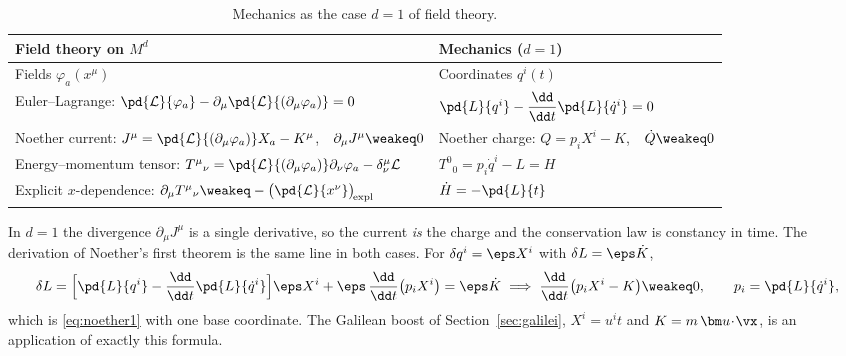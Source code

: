 \begin{table}[ht]
\centering
\small
\renewcommand{\arraystretch}{1.35}
\setlength{\tabcolsep}{4pt}
\begin{tabular}{@{}>{\raggedright\arraybackslash}p{7.3cm}>{\raggedright\arraybackslash}p{7.3cm}@{}}
\toprule
Field theory on $M^d$ & Mechanics ($d=1$)\\
\midrule
Fields $\varphi_a(x^\mu)$ & Coordinates $q^i(t)$\\
Euler--Lagrange: $\pd{\mathcal L}{\varphi_a}-\partial_\mu\pd{\mathcal L}{(\partial_\mu\varphi_a)}=0$
  & $\pd{L}{q^i}-\dfrac{\dd}{\dd t}\pd{L}{\dot q^i}=0$\\
Noether current: $J^\mu=\pd{\mathcal L}{(\partial_\mu\varphi_a)}X_a-K^\mu$,\ \ $\partial_\mu J^\mu\weakeq0$
  & Noether charge: $Q=p_iX^i-K$,\ \ $\dot Q\weakeq0$\\
Energy--momentum tensor: $T^\mu{}_\nu=\pd{\mathcal L}{(\partial_\mu\varphi_a)}\partial_\nu\varphi_a-\delta^\mu_\nu\mathcal L$
  & $T^0{}_0=p_i\dot q^i-L=H$\\
Explicit $x$-dependence: $\partial_\mu T^\mu{}_\nu\weakeq-\big(\pd{\mathcal L}{x^\nu}\big)_{\!\rm expl}$
  & $\dot H=-\pd{L}{t}$\\
\bottomrule
\end{tabular}
\caption{Mechanics as the case $d=1$ of field theory.}
\label{tab:dictionary-dof}
\end{table}

In $d=1$ the divergence $\partial_\mu J^\mu$ is a single derivative, so the
current \emph{is} the charge and the conservation law is constancy in time.
The derivation of Noether's first theorem is the same line in both cases. For
$\delta q^i=\eps X^i$ with $\delta L=\eps\dot K$,
\begin{equation}\label{eq:noether-mech}
  \delta L=\Big[\pd{L}{q^i}-\frac{\dd}{\dd t}\pd{L}{\dot q^i}\Big]\eps X^i
  +\eps\,\frac{\dd}{\dd t}\big(p_iX^i\big)=\eps\dot K
  \;\Longrightarrow\;
  \frac{\dd}{\dd t}\big(p_iX^i-K\big)\weakeq0,\qquad p_i=\pd{L}{\dot q^i},
\end{equation}
which is \eqref{eq:noether1} with one base coordinate. The Galilean boost of
Section~\ref{sec:galilei}, $X^i=u^it$ and $K=m\,\bm u\!\cdot\!\vx$, is an
application of exactly this formula.

